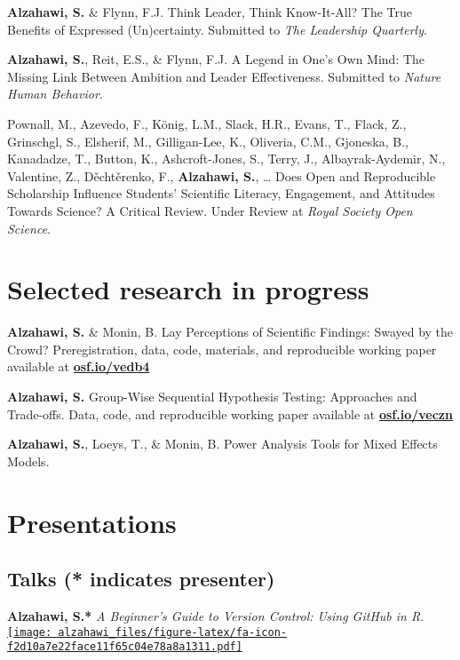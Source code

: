 \documentclass[11pt,a4paper,]{awesome-cv}
\begin{document}
\textbf{Alzahawi, S.} \& Flynn, F.J. Think Leader, Think Know-It-All?
The True Benefits of Expressed (Un)certainty. Submitted to \emph{The
Leadership Quarterly}.

\textbf{Alzahawi, S.}, Reit, E.S., \& Flynn, F.J. A Legend in One's Own
Mind: The Missing Link Between Ambition and Leader Effectiveness.
Submitted to \emph{Nature Human Behavior}.

Pownall, M., Azevedo, F., König, L.M., Slack, H.R., Evans, T., Flack,
Z., Grinschgl, S., Elsherif, M., Gilligan-Lee, K., Oliveria, C.M.,
Gjoneska, B., Kanadadze, T., Button, K., Ashcroft-Jones, S., Terry, J.,
Albayrak-Aydemir, N., Valentine, Z., Děchtěrenko, F., \textbf{Alzahawi,
S.}, \ldots{} Does Open and Reproducible Scholarship Influence Students'
Scientific Literacy, Engagement, and Attitudes Towards Science? A
Critical Review. Under Review at \emph{Royal Society Open Science}.

\hypertarget{selected-research-in-progress}{%
\section{Selected research in
progress}\label{selected-research-in-progress}}

\textbf{Alzahawi, S.} \& Monin, B. Lay Perceptions of Scientific
Findings: Swayed by the Crowd? Preregistration, data, code, materials,
and reproducible working paper available at
\href{https://osf.io/vedb4}{\textbf{osf.io/vedb4}}

\textbf{Alzahawi, S.} Group-Wise Sequential Hypothesis Testing:
Approaches and Trade-offs. Data, code, and reproducible working paper
available at \href{https://osf.io/veczn}{\textbf{osf.io/veczn}}

\textbf{Alzahawi, S.}, Loeys, T., \& Monin, B. Power Analysis Tools for
Mixed Effects Models.

\hypertarget{presentations}{%
\section{Presentations}\label{presentations}}

\hypertarget{talks-indicates-presenter}{%
\subsection{Talks (* indicates
presenter)}\label{talks-indicates-presenter}}

\textbf{Alzahawi, S.*} \emph{A Beginner's Guide to Version Control:
Using GitHub in R}.
\href{https://shilaan.rbind.io/talks/version-control/}{\texttt{[image: alzahawi\_files/figure-latex/fa-icon-f2d10a7e22face11f65c04e78a8a1311.pdf]}}
\end{document}
